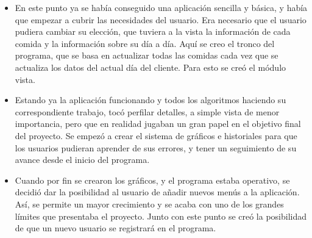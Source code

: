 \begin{itemize}
\item	En este punto ya se había conseguido una aplicación sencilla y básica, y había que empezar a cubrir las necesidades del usuario. Era necesario que el usuario pudiera cambiar su elección, que tuviera a la vista la información de cada comida y la información sobre su día a día. Aquí se creo el tronco del programa, que se basa en actualizar todas las comidas cada vez que se actualiza los datos del actual día del cliente. Para esto se creó el módulo vista.
\item	Estando ya la aplicación funcionando y todos los algoritmos haciendo su correspondiente trabajo, tocó perfilar detalles, a simple vista de menor importancia, pero que en realidad jugaban un gran papel en el objetivo final del proyecto. Se empezó a crear el sistema de gráficos e historiales para que los usuarios pudieran aprender de sus errores, y tener un seguimiento de su avance desde el inicio del programa.
\item Cuando por fin se crearon los gráficos, y  el programa estaba operativo, se decidió dar la posibilidad al usuario de añadir nuevos menús a la aplicación. Así, se permite un mayor crecimiento y se acaba con uno de los grandes límites que presentaba el proyecto. Junto con este punto se creó la posibilidad de que un nuevo usuario se registrará en el programa.

\end{itemize}